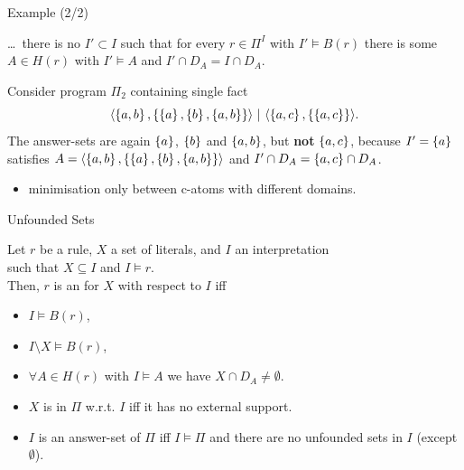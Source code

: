 \documentclass{beamer}
\newcommand{\catom}[2]{\ensuremath{\langle #1, #2 \rangle}}
\begin{document}
\begin{frame}{Example (2/2)}

	\ldots\ there is no $I' \subset I$ such that for every $r \in \Pi^I$ with $I' \models B(r)$ there is some $A \in H(r)$ with
	$I' \models A$ and $I' \cap D_A = I \cap D_A$.

	\begin{example}[2]
	Consider program $\Pi_2$ containing single fact
	$$\catom{\set{a,b}}{\set{\set{a}, \set{b}, \set{a,b}}} \ |\  \catom{\set{a,c}}{\set{\set{a,c}}}.$$
	The answer-sets are again $\left\{{a}\right\}$, $\left\{{b}\right\}$ and $\left\{{a,b}\right\}$, but \textbf{not} $\left\{{a,c}\right\}$,\newline
	because $I' = \left\{{a}\right\}$ satisfies $A = \catom{\set{a,b}}{\set{\set{a}, \set{b}, \set{a,b}}}$\newline
	and $I' \cap D_A = \left\{{a,c}\right\} \cap D_A$.
	\end{example}

	\pause

	\begin{itemize}
		\item minimisation only between c-atoms with different domains.
	\end{itemize}

\end{frame}

\begin{frame}{Unfounded Sets}

	\begin{definition}
	Let $r$ be a rule, $X$ a set of literals, and $I$ an interpretation\\
	such that $X \subseteq I$ and $I \models r$.\\
	Then, $r$ is an \emph{} for $X$ with respect to $I$ iff
	\begin{itemize}
		\item $I \models B(r)$,
		\item $I \setminus X \models B(r)$,
		\item $\forall A \in H(r)$ with $I \models A$ we have $X \cap D_A \neq \emptyset$.
	\end{itemize}
	\end{definition}

	\pause

	\begin{itemize}
		\item $X$ is \emph{} in $\Pi$ w.r.t. $I$ iff it has no external support.
		\item $I$ is an answer-set of $\Pi$ iff $I \models \Pi$ and there are no unfounded sets in $I$ (except $\emptyset$).
	\end{itemize}

\end{frame}
\end{document}
